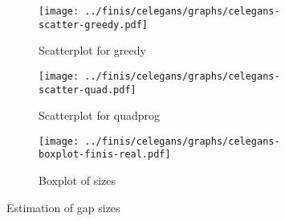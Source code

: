 \documentclass[12pt]{amsart}
\begin{document}
\begin{figure}[h!]
  \centering

    \begin{subfigure}{230pt}
    \centering
      \texttt{[image: ../finis/celegans/graphs/celegans-scatter-greedy.pdf]}
      \caption{Scatterplot for greedy}
    \end{subfigure}%
    \begin{subfigure}{230pt}
      \texttt{[image: ../finis/celegans/graphs/celegans-scatter-quad.pdf]}
      \caption{Scatterplot for quadprog}
    \end{subfigure}

    \begin{subfigure}{400pt}
      \texttt{[image: ../finis/celegans/graphs/celegans-boxplot-finis-real.pdf]}
      \caption{Boxplot of sizes}
    \end{subfigure}

  \caption{Estimation of gap sizes}
\end{figure}
\end{document}
